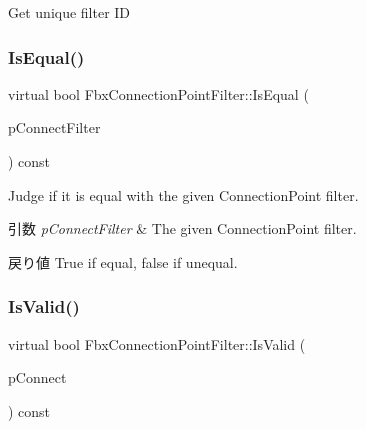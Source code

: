 Get unique filter ID 

\mbox{\label{class_fbx_connection_point_filter_a20ccb6e7d73551ecec421860e6e775e0}} 
\subsubsection{\texorpdfstring{Is\+Equal()}{IsEqual()}}
{\footnotesize\ttfamily virtual bool Fbx\+Connection\+Point\+Filter\+::\+Is\+Equal (\begin{DoxyParamCaption}\item[{\hyperlink{class_fbx_connection_point_filter}{Fbx\+Connection\+Point\+Filter} $\ast$}]{p\+Connect\+Filter }\end{DoxyParamCaption}) const\hspace{0.3cm}{\ttfamily [virtual]}}

Judge if it is equal with the given Connection\+Point filter. 
\begin{DoxyParams}{引数}
{\em p\+Connect\+Filter} & The given Connection\+Point filter. \\
\hline
\end{DoxyParams}
\begin{DoxyReturn}{戻り値}
{\ttfamily True} if equal, {\ttfamily false} if unequal. 
\end{DoxyReturn}
\mbox{\label{class_fbx_connection_point_filter_abed99893efb038558371fd8a70c815b4}} 
\subsubsection{\texorpdfstring{Is\+Valid()}{IsValid()}}
{\footnotesize\ttfamily virtual bool Fbx\+Connection\+Point\+Filter\+::\+Is\+Valid (\begin{DoxyParamCaption}\item[{\hyperlink{class_fbx_connection_point}{Fbx\+Connection\+Point} $\ast$}]{p\+Connect }\end{DoxyParamCaption}) const\hspace{0.3cm}{\ttfamily [virtual]}}

